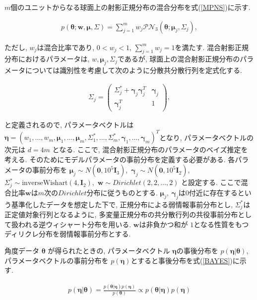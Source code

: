 \documentclass[a4paper,11pt]{jarticle}
\begin{document}
$m$個のユニットからなる球面上の射影正規分布の混合分布を式(\ref{MPNS})に示す. 

\vspace{-2zh}
\begin{eqnarray}
\label{MPNS}
p(\bm \theta;\bm w,\bm \mu, \Sigma) = \sum^m_{j=1} w_j \mathcal{PN}_3(\bm \theta;\bm \mu_j, \Sigma_j),
\end{eqnarray}

\noindent
ただし, $w_j$は混合比率であり, $0 < w_j < 1$, $\sum^m_{j=1} w_j = 1$を満たす. 混合射影正規分布におけるパラメータは, $w, \bm \mu_j, \Sigma_j$であるが, 球面上の混合射影正規分布のパラメータについては識別性を考慮して次のように分散共分散行列を定式化する. 

\begin{eqnarray}
\label{SIGMA}
 \Sigma_j = \left(
    \begin{array}{cc}
      \Sigma^*_j + \bm \gamma_j \bm \gamma_j^T & \bm \gamma_j \\
      \bm \gamma_j^T & 1
    \end{array}
  \right),
\end{eqnarray}

\noindent
と定義されるので, パラメータベクトルは$\bm \eta = (w_1, \dots, w_m, \bm \mu_1, \dots, \bm \mu_m, \Sigma^*_1, \dots, \Sigma^*_m, \bm \gamma_1, \dots, \bm \gamma_m)^T$となり, パラメータベクトルの次元は $d = 4m$ となる. ここで, 混合射影正規分布のパラメータのベイズ推定を考える. そのためにモデルパラメータの事前分布を定義する必要がある. 各パラメータの事前分布を $\bm \mu_j \sim N(\bm 0, 10^5 \bm I_3)$,\ $\bm \gamma_j \sim  N(\bm 0, 10^5 \bm I_2)$,\ $\Sigma^*_j \sim \mathrm{inverse Wishart}(4,\bm I_2)$,\ $\bm w \sim Dirichlet(2,2, \dots, 2)$ と設定する. ここで混合比率$\bm w$は$m$次の$Dirichlet$分布に従うものとする. $\bm \mu_j,\ \bm \gamma_j$は$0$付近に存在するという基準化したデータを想定した下で, 正規分布による弱情報事前分布とし, $\Sigma^*_j$は正定値対象行列となるように, 多変量正規分布の共分散行列の共役事前分布として扱われる逆ウィシャート分布を用いる. $\bm w$は非負かつ和が $1$となる性質をもつディリクレ分布を弱情報事前分布とする.

角度データ $\bm \theta$ が得られたときの, パラメータベクトル $\bm \eta$の事後分布を $p(\bm \eta| \bm \theta)$, パラメータベクトルの事前分布を $p(\bm \eta)$とすると事後分布を式(\ref{BAYES})に示す. 

\begin{eqnarray}
\label{BAYES}
p(\bm \eta | \bm \theta) = \frac{p(\bm \theta | \bm \eta) p(\bm \eta)}{p(\bm \theta)} \propto p(\bm \theta | \bm \eta) p(\bm \eta)
\end{eqnarray}
\end{document}
